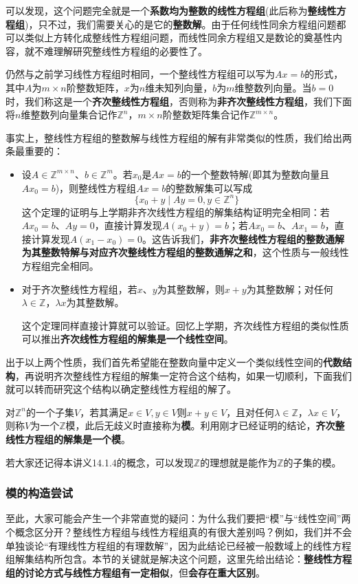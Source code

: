 \documentclass[a4paper,UTF8,fontset=windows,AutoFakeBold]{ctexart}
\newcommand*{\note}{\noindent *}
\begin{document}
可以发现，这个问题完全就是一个\textbf{系数均为整数的线性方程组}(此后称为\textbf{整线性方程组})，只不过，我们需要关心的是它的\textbf{整数解}。由于任何线性同余方程组问题都可以类似上方转化成整线性方程组问题，而线性同余方程组又是数论的奠基性内容，就不难理解研究整线性方程组的必要性了。

仍然与之前学习线性方程组时相同，一个整线性方程组可以写为$Ax=b$的形式，其中$A$为$m\times n$阶整数矩阵，$x$为$n$维未知列向量，$b$为$m$维整数列向量。当$b=0$时，我们称这是一个\textbf{齐次整线性方程组}，否则称为\textbf{非齐次整线性方程组}，我们下面将$n$维整数列向量集合记作$\mathbb{Z}^n$，$m\times n$阶整数矩阵集合记作$\mathbb{Z}^{m\times n}$。

事实上，整线性方程组的整数解与线性方程组的解有非常类似的性质，我们给出两条最重要的：
\begin{itemize}
    \item 设$A\in\mathbb{Z}^{m\times n}$、$b\in\mathbb{Z}^m$。若$x_0$是$Ax=b$的一个整数特解(即其为整数向量且$Ax_0=b$)，则整线性方程组$Ax=b$的整数解集可以写成
    $$\{x_0+y\mid Ay=0,y\in\mathbb{Z}^n\}$$
    这个定理的证明与上学期非齐次线性方程组的解集结构证明完全相同：若$Ax_0=b$、$Ay=0$，直接计算发现$A(x_0+y)=b$；若$Ax_0=b$、$Ax_1=b$，直接计算发现$A(x_1-x_0)=0$。这告诉我们，\textbf{非齐次整线性方程组的整数通解为其整数特解与对应齐次整线性方程组的整数通解之和}，这个性质与一般线性方程组完全相同。
    \item 对于齐次整线性方程组，若$x$、$y$为其整数解，则$x+y$为其整数解；对任何$\lambda\in\mathbb{Z}$，$\lambda x$为其整数解。
    
    这个定理同样直接计算就可以验证。回忆上学期，齐次线性方程组的类似性质可以推出\textbf{齐次线性方程组的解集是一个线性空间}。
\end{itemize}

出于以上两个性质，我们首先希望能在整数向量中定义一个类似线性空间的\textbf{代数结构}，再说明齐次整线性方程组的解集一定符合这个结构，如果一切顺利，下面我们就可以转而研究这个结构以确定整线性方程组的解了。

对$\mathbb{Z}^n$的一个子集$V$，若其满足$x\in V,y\in V$则$x+y\in V$，且对任何$\lambda\in\mathbb{Z}$，$\lambda x\in V$，则称$V$为一个$\mathbb{Z}$模，此后无歧义时直接称为\textbf{模}。利用刚才已经证明的结论，\textbf{齐次整线性方程组的解集是一个模}。

\note 若大家还记得本讲义14.1.4的概念，可以发现$\mathbb{Z}$的理想就是能作为$\mathbb{Z}$的子集的模。

\subsubsection{模的构造尝试}
至此，大家可能会产生一个非常直觉的疑问：为什么我们要把``模''与``线性空间''两个概念区分开？整线性方程组与线性方程组真的有很大差别吗？例如，我们并不会单独谈论``有理线性方程组的有理数解''，因为此结论已经被一般数域上的线性方程组解集结构所包含。本节的关键就是解决这个问题，这里先给出结论：\textbf{整线性方程组的讨论方式与线性方程组有一定相似}，但\textbf{会存在重大区别}。
\end{document}
